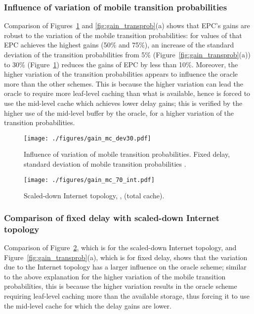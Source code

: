\documentclass[conference]{IEEEtran}
\newcommand{\mynote}[1]{{{\medskip
\footnotesize \em \noindent Note: #1}}\medskip}
\renewcommand{\mynote}[1]{}
\begin{document}
\subsubsection{Influence of variation of mobile transition probabilities} Comparison of Figures~\ref{fig:gain_var_trans} and \ref{fig:gain_transprob}(a) shows that  EPC's   gains  are robust to the variation of the mobile transition probabilities: for values of  that EPC achieves the highest gains (50\% and 75\%), an increase of the standard deviation of the  transition probabilities from 5\% (Figure~\ref{fig:gain_transprob}(a)) to 30\% (Figure~\ref{fig:gain_var_trans}) reduces the gains of EPC by less than 10\%.
 Moreover, the higher variation of the  transition probabilities appears to influence the oracle  more than the other schemes.
This is because the higher variation can lead the oracle to require more leaf-level caching than what is  available, hence is forced to use the mid-level cache which achieves lower delay gains; this is verified by the higher use of the mid-level buffer by the oracle, for a higher variation of the transition probabilities.


\mynote{
\begin{itemize}
\item Add note that this is verified by the increased utilization of the mid-level cache for the oracle.
\end{itemize}
}


\begin{figure}[tb]
\centering
\texttt{[image: ./figures/gain\_mc\_dev30.pdf]}
\vspace{-0.1in}
\caption{Influence of variation of mobile transition probabilities. Fixed delay, standard deviation of mobile transition probabilities .}
\label{fig:gain_var_trans}
\end{figure}


\begin{figure}[tb]
\vspace{-0.05in}
\centering
\texttt{[image: ./figures/gain\_mc\_70\_int.pdf]}
\vspace{-0.1in}
\caption{Scaled-down Internet topology, ,  (total cache).}
\label{fig:gain_70_int}
\vspace{-0.3in}
\end{figure}

\subsubsection{Comparison of fixed  delay with scaled-down  Internet topology} Comparison of Figure~\ref{fig:gain_70_int}, which is for the scaled-down Internet topology, and  Figure~\ref{fig:gain_transprob}(a), which is for fixed delay, shows that the variation due to the Internet topology has a larger influence on the oracle scheme; similar to the above explanation for the higher variation of the mobile transition probabilities, this is because the higher variation results in the oracle scheme  requiring leaf-level caching more than the available storage, thus forcing it to use the mid-level cache for which the delay gains are lower.
\end{document}
